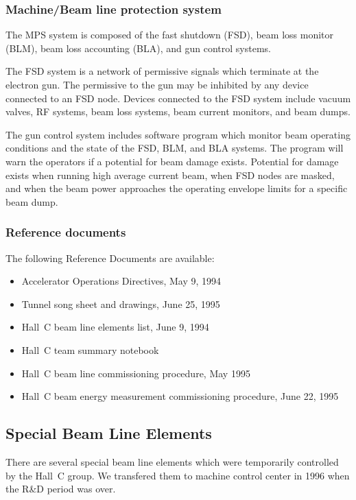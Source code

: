 \subsubsection{Machine/Beam line protection system}

The MPS system is composed of the fast shutdown (FSD), beam loss
monitor (BLM), beam loss accounting (BLA), and gun control systems.

The FSD system is a network of permissive signals which terminate
at the electron gun. The permissive to the gun may be inhibited by any 
device connected to an FSD node.
Devices connected to the FSD system include vacuum valves, RF
systems, beam loss systems, beam current monitors, and beam dumps.

The gun control system includes software program which monitor
beam operating conditions and the state of the FSD, BLM, and BLA systems.
The program will warn the operators if a potential for beam damage
exists. Potential for damage exists when running high average current
beam, when FSD nodes are masked, and when the beam power approaches
the operating envelope limits for a specific beam dump.

\subsubsection{Reference documents}

The following Reference Documents are available:

\begin{itemize}
\item{Accelerator Operations Directives, May 9, 1994}
\item{Tunnel song sheet and drawings, June 25, 1995}
\item{Hall~C beam line elements list, June 9, 1994}
\item{Hall~C team summary notebook}
\item{Hall~C beam line commissioning procedure, May 1995}
\item{Hall~C beam energy measurement commissioning procedure, June 22, 1995}
\end{itemize}

\subsection{Special Beam Line Elements}

There are several special beam line elements which were temporarily
controlled by the Hall~C group. We transfered them to machine
control center in 1996 when the R\&D period was over.

